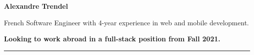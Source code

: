 \documentclass{cv}
\begin{document}
\pagestyle{empty}

\noindent\begin{minipage}[c]{\textwidth}
	\large

	\textbf{\Large\color{solviolet} Alexandre Trendel}

	\smallskip

	French Software Engineer with 4-year experience in web and mobile development.

	\smallskip

	\textbf{Looking to work abroad in a full-stack position from Fall 2021.}

	\color{solviolet}\rule{3cm}{1pt}

\end{minipage}

\vspace{3ex}
\end{document}

